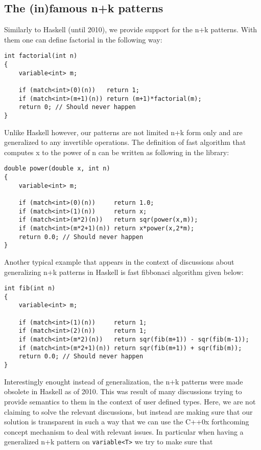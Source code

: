 \documentclass[preprint]{sigplanconf}
\DeclareRobustCommand{\code}[1]{{\lstinline[breaklines=false]{#1}}}
\begin{document}
\subsection{The (in)famous n+k patterns}

Similarly to Haskell (until 2010), we provide support for the n+k patterns. With 
them one can define factorial in the following way:

\begin{lstlisting}
int factorial(int n)
{
    variable<int> m;

    if (match<int>(0)(n))   return 1;
    if (match<int>(m+1)(n)) return (m+1)*factorial(m);
    return 0; // Should never happen
}
\end{lstlisting}

Unlike Haskell however, our patterns are not limited n+k form only and are 
generalized to any invertible operations. The definition of fast algorithm that 
computes x to the power of n can be written as following in the library:

\begin{lstlisting}
double power(double x, int n)
{
    variable<int> m;

    if (match<int>(0)(n))     return 1.0;
    if (match<int>(1)(n))     return x;
    if (match<int>(m*2)(n))   return sqr(power(x,m));
    if (match<int>(m*2+1)(n)) return x*power(x,2*m);
    return 0.0; // Should never happen
}
\end{lstlisting}

Another typical example that appears in the context of discussions about 
generalizing n+k patterns in Haskell is fast fibbonaci algorithm given below:

\begin{lstlisting}
int fib(int n)
{
    variable<int> m;

    if (match<int>(1)(n))     return 1;
    if (match<int>(2)(n))     return 1;
    if (match<int>(m*2)(n))   return sqr(fib(m+1)) - sqr(fib(m-1));
    if (match<int>(m*2+1)(n)) return sqr(fib(m+1)) + sqr(fib(m));
    return 0.0; // Should never happen
}
\end{lstlisting}

Interestingly enought instead of generalization, the n+k patterns were made 
obsolete in Haskell as of 2010\cite{HaskelDocMakingThis}. This was result of 
many discussions trying to provide semantics to them in the context of user 
defined types. Here, we are not claiming to solve the relevant discussions, but 
instead are making sure that our solution is transparent in such a way that we 
can use the C++0x forthcoming concept mechanism to deal with relevant issues. In 
particular when having a generalized n+k pattern on \code{variable<T>} we try to make 
sure that 
\end{document}
